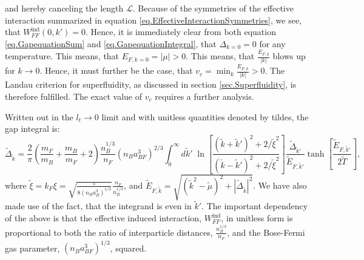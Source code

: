 and hereby canceling the length $\mathcal{L}$. Because of the symmetries of the effective interaction summarized in equation \eqref{eq.EffectiveInteractionSymmetries}, we see, that $W^\text{ind}_{FF}(0,k') = 0$. Hence, it is immediately clear from both equation \eqref{eq.GapequationSum} and \eqref{eq.GapequationIntegral}, that $\Delta_{k=0} = 0$ for any temperature. This means, that $E_{F,k=0} = |\mu| > 0$. This means, that $\frac{E_{F,k}}{|k|}$ blows up for $k\to 0$. Hence, it must further be the case, that $v_c = \min_k \frac{E_{F,k}}{|k|} > 0$. The Landau criterion for superfluidity, as discussed in section \ref{sec.Superfluidity}, is therefore fulfilled. The exact value of $v_c$ requires a further analysis. 

Written out in the $l_t \to 0$ limit and with unitless quantities denoted by tildes, the gap integral is:
\begin{equation}
\tilde{\Delta}_{\tilde{k}} = \frac{2}{\pi}\left(\frac{m_F}{m_B} + \frac{m_B}{m_F}+ 2\right)\frac{n_B^{1/3}}{n_F}(n_Ba_{BF}^3)^{2/3} \int_0^\infty d\tilde{k}' \; \ln\left[\frac{(\tilde{k}+\tilde{k}')^2+2/\tilde{\xi}^2}{(\tilde{k}-\tilde{k}')^2+2/\tilde{\xi}^2}\right] \frac{\tilde{\Delta}_{\tilde{k}'}}{\tilde{E}_{F,\tilde{k}'}}\tanh\left[\frac{\tilde{E}_{F,\tilde{k}'}}{2\tilde{T}}\right],
\label{eq.GapequationIntegralUnitless}
\end{equation} 
where $\tilde{\xi} = k_F\xi = \sqrt{ \frac{\pi}{ 8(n_Ba_B^3)^{1/3} } } \frac{n_F}{n_B^{1/3}}$, and $\tilde{E}_{F,\tilde{k}} = \sqrt{(\tilde{k}^2-\tilde{\mu})^2 + |\tilde{\Delta}_{\tilde{k}}|^2}$. We have also made use of the fact, that the integrand is even in $\tilde{k}'$. The important dependency of the above is that the effective induced interaction, $W_{FF}^\text{ind}$, in unitless form is proportional to both the ratio of interparticle distances, $\frac{n_B^{1/3}}{n_F}$, and the Bose-Fermi gas parameter, $(n_Ba_{BF}^3)^{1/3}$, squared.

